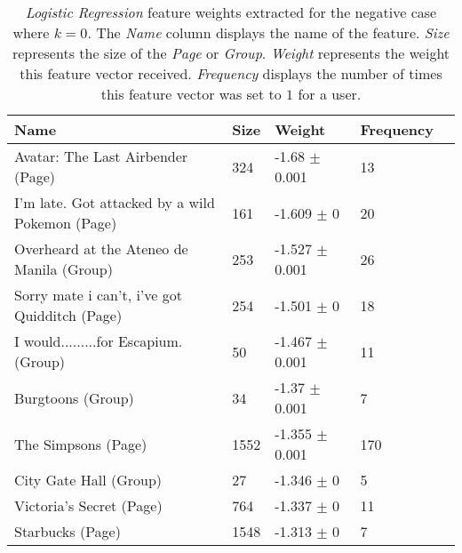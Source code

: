 \begin{table}[h]
\begin{minipage}[b]{1.0\textwidth}
\centering
  \begin{tabular}{|l|l|l|l|l|} %
  \hline
  \textbf{Name} & \textbf{Size} & \textbf{Weight} & \textbf{Frequency} \\ \hline

\small{Avatar: The Last Airbender (Page)} & 324 & -1.68 $\pm$ 0.001 & 13 \\ \hline
\small{I'm late. Got attacked by a wild Pokemon (Page)} & 161 & -1.609 $\pm$ 0 & 20 \\ \hline
\small{Overheard at the Ateneo de Manila (Group)} & 253 & -1.527 $\pm$ 0.001 & 26 \\ \hline
\small{Sorry mate i can't, i've got Quidditch (Page)} & 254 & -1.501 $\pm$ 0 & 18 \\ \hline
\small{I would.........for Escapium. (Group)} & 50 & -1.467 $\pm$ 0.001 & 11 \\ \hline
\small{Burgtoons (Group)} & 34 & -1.37 $\pm$ 0.001 & 7 \\ \hline
\small{The Simpsons (Page)} & 1552 & -1.355 $\pm$ 0.001 & 170 \\ \hline
\small{City Gate Hall (Group)} & 27 & -1.346 $\pm$ 0 & 5 \\ \hline
\small{Victoria's Secret (Page)} & 764 & -1.337 $\pm$ 0 & 11 \\ \hline
\small{Starbucks (Page)} & 1548 & -1.313 $\pm$ 0 & 7 \\ \hline
  \end{tabular}
  \caption{\emph{Logistic Regression} feature weights extracted for the negative case where $k=0$. The \emph{Name} column displays the name of the feature.
                        \emph{Size} represents the size of the \emph{Page} or \emph{Group}.
                        \emph{Weight} represents the weight this feature vector received.  
                        \emph{Frequency} displays the number of times this feature vector was set to $1$ for a user.}
\end{minipage}
\end{table}
